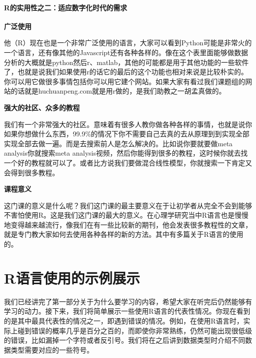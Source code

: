 \documentclass[
  oneside]{book}
\begin{document}
\hypertarget{rux7684ux5b9eux7528ux6027ux4e4bux4e8cux9002ux5e94ux6570ux5b57ux5316ux65f6ux4ee3ux7684ux9700ux6c42}{%
\paragraph{R的实用性之二：适应数字化时代的需求}\label{rux7684ux5b9eux7528ux6027ux4e4bux4e8cux9002ux5e94ux6570ux5b57ux5316ux65f6ux4ee3ux7684ux9700ux6c42}}

\textbf{广泛使用}

他（R）现在也是一个非常广泛使用的语言，大家可以看到Python可能是非常火的一个语言，还有像其他的Javascript还有各种各样的。像在这个表里面能够做数据分析的大概就是python然后r、matlab，其他的可能都是用于其他功能的一些软件了，也就是说我们如果使用r的话它的最后的这个功能也相对来说是比较朴实的。你可以用它做很多事情包括你可以用它建个网站。如果大家有看过我们课题组的网站的话就是huchuanpeng.com就是用r做的，是我们助教之一胡孟真做的。

\textbf{强大的社区、众多的教程}

我们有一个非常强大的社区。意味着有很多人教你做各种各样的事情，也就是说你如果你想做什么东西，99.9\%的情况下你不需要自己去真的去从原理到到实现全部实现全部去做一遍。而是去搜索前人是怎么解决的。比如说你要就要做meta analysis你就搜索meta analysis视频，然后你能得到很多的教程，这时候你就去找一个好的教程就可以了。或者比方说我们要做混合线性模型，你就搜索一下肯定又会得到很多教程。

\textbf{课程意义}

这门课的意义是什么呢？我们这门课的最主要意义在于让初学者从完全不会到能够不害怕使用R。这是我们这门课的最大的意义。在心理学研究当中R语言也是慢慢地变得越来越流行，像我们在有一些比较新的期刊，他会发表很多教程性的文章，就是专门教大家如何去使用各种各样的新的方法。其中有多篇关于R语言的使用的。

\hypertarget{rux8bedux8a00ux4f7fux7528ux7684ux793aux4f8bux5c55ux793a}{%
\section{R语言使用的示例展示}\label{rux8bedux8a00ux4f7fux7528ux7684ux793aux4f8bux5c55ux793a}}

我们已经讲完了第一部分关于为什么要学习的内容，希望大家在听完后仍然能够有学习的动力。接下来，我们将简单展示一些使用R语言的代表性情况。你现在看到的是其中最具代表性的情况之一，即遇到错误的情况。例如，在使用R语言时，实际上碰到错误的概率几乎是百分之百的，而即使你非常熟练，仍然可能出现很低级的错误，比如漏掉一个字符或者反引号。我们将在之后讲到数据类型时介绍不同数据类型需要对应的一些符号。
\end{document}
